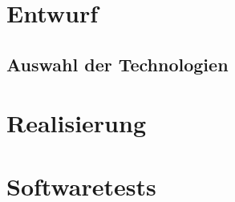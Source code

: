 \section{Entwurf}
    \subsection{Auswahl der Technologien}
    
\section{Realisierung}
    
\section{Softwaretests}
    